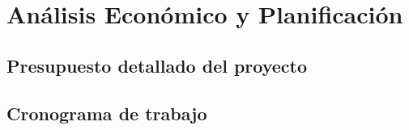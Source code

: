 \chapter{Análisis Económico y Planificación}
\section{Presupuesto detallado del proyecto}

\section{Cronograma de trabajo}